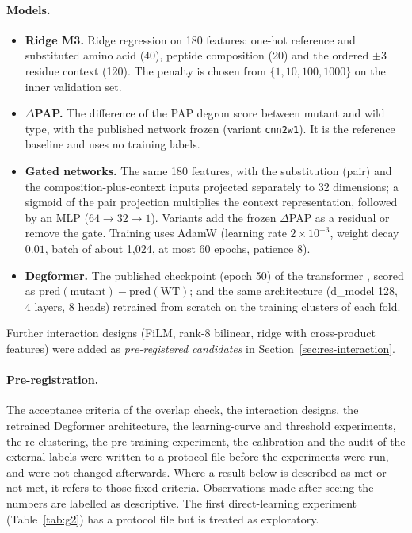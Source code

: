 \paragraph{Models.}
\begin{itemize}
  \item \textbf{Ridge M3.} Ridge regression \citep{hoerl1970} on 180 features: one-hot reference and
        substituted amino acid (40), peptide composition (20) and the ordered $\pm 3$ residue context (120).
        The penalty is chosen from $\{1,10,100,1000\}$ on the inner validation set.
  \item \textbf{$\Delta$PAP.} The difference of the PAP degron score \citep{voutsinos2026} between mutant and
        wild type, with the published network frozen (variant \texttt{cnn2w1}). It is the reference
        baseline and uses no training labels.
  \item \textbf{Gated networks.} The same 180 features, with the substitution (pair) and the
        composition-plus-context inputs projected separately to 32 dimensions; a sigmoid of the pair projection
        multiplies the context representation, followed by an MLP ($64\to32\to1$). Variants add the frozen
        $\Delta$PAP as a residual or remove the gate. Training uses AdamW (learning rate $2\times10^{-3}$,
        weight decay $0.01$, batch of about 1,024, at most 60 epochs, patience 8).
  \item \textbf{Degformer.} The published checkpoint (epoch 50) of the transformer \citep{degformer}, scored as
        $\mathrm{pred}(\mathrm{mutant})-\mathrm{pred}(\mathrm{WT})$; and the same architecture
        (d\_model 128, 4 layers, 8 heads) retrained from scratch on the training clusters of each fold.
\end{itemize}
Further interaction designs (FiLM, rank-8 bilinear, ridge with cross-product features) were added as
\emph{pre-registered candidates} in Section~\ref{sec:res-interaction}.

\paragraph{Pre-registration.}
The acceptance criteria of the overlap check, the interaction designs, the retrained Degformer architecture, the
learning-curve and threshold experiments, the re-clustering, the pre-training experiment, the calibration and
the audit of the external labels were written to a protocol file before the experiments were run, and were
not changed afterwards. Where a result below is described as met or not met, it refers to those fixed criteria.
Observations made after seeing the numbers are labelled as descriptive. The first direct-learning experiment
(Table~\ref{tab:g2}) has a protocol file but is treated as exploratory.

